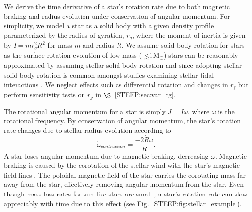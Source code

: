 We derive the time derivative of a star's rotation rate due to both magnetic braking and radius evolution under conservation of angular momentum.  For simplicity, we model a star as a solid body with a given density profile parameterized by the radius of gyration, $r_g$, where the moment of inertia is given by $I = m r_g^2 R^2$ for mass $m$ and radius $R$.  We assume solid body rotation for stars as the surface rotation evolution of low-mass (${\lsim}1$M$_{\odot}$) stars can be reasonably approximated by assuming stellar solid-body rotation \citep{Bouvier1997} and since adopting stellar solid-body rotation is common amongst studies examining stellar-tidal interactions \citep[e.g.][]{DobbsDixon2004,Heller2011,Barnes2013,Repetto2014,Bolmont2016,Bolmont2017}.  We neglect effects such as differential rotation and changes in $r_g$ but perform sensitivity tests on $r_g$ in $\S$~\ref{STEEP:sec:var_rg}.

The rotational angular momentum for a star is simply $J = I \omega$, where $\omega$ is the rotational frequency.  By conservation of angular momentum, the star's rotation rate changes due to stellar radius evolution according to
\begin{equation} \label{STEEP:eqn:rot_ang_mom_dt}
\dot{\omega}_{contraction} = \frac{-2 \dot{R} \omega}{R}.
\end{equation}
A star loses angular momentum due to magnetic braking, decreasing $\omega$.  Magnetic braking is caused by the corotation of the stellar wind with the star's magnetic field lines \citep[see][]{Parker1958,Mestel1968}.  The poloidal magnetic field of the star carries the corotating mass far away from the star, effectively removing angular momentum from the star.  Even though mass loss rates for sun-like stars are small \citep[e.g., $\dot{M}{\sim}10^{-14}$ M$_{\odot}$/yr;][]{Tarduno2014}, a star's rotation rate can slow appreciably with time due to this effect (see Fig.~\ref{STEEP:fig:stellar_example}).  

